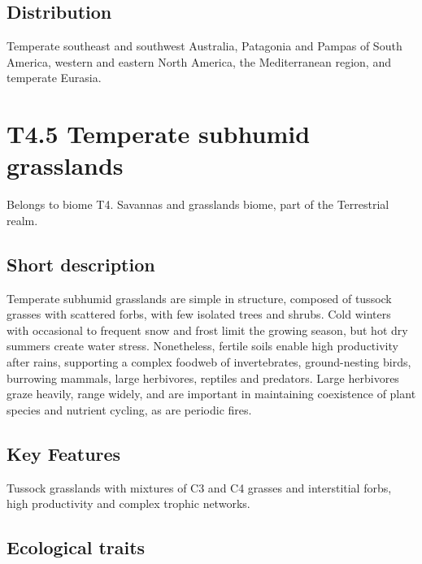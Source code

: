\documentclass[
  letterpaper,
  DIV=11,
  numbers=noendperiod]{scrartcl}
\begin{document}
\subsection{Distribution}\label{distribution-86}

Temperate southeast and southwest Australia, Patagonia and Pampas of
South America, western and eastern North America, the Mediterranean
region, and temperate Eurasia.

\section{T4.5 Temperate subhumid
grasslands}\label{t4.5-temperate-subhumid-grasslands}

Belongs to biome T4. Savannas and grasslands biome, part of the
Terrestrial realm.

\subsection{Short description}\label{short-description-87}

Temperate subhumid grasslands are simple in structure, composed of
tussock grasses with scattered forbs, with few isolated trees and
shrubs. Cold winters with occasional to frequent snow and frost limit
the growing season, but hot dry summers create water stress.
Nonetheless, fertile soils enable high productivity after rains,
supporting a complex foodweb of invertebrates, ground-nesting birds,
burrowing mammals, large herbivores, reptiles and predators. Large
herbivores graze heavily, range widely, and are important in maintaining
coexistence of plant species and nutrient cycling, as are periodic
fires.

\subsection{Key Features}\label{key-features-87}

Tussock grasslands with mixtures of C3 and C4 grasses and interstitial
forbs, high productivity and complex trophic networks.

\subsection{Ecological traits}\label{ecological-traits-87}
\end{document}

